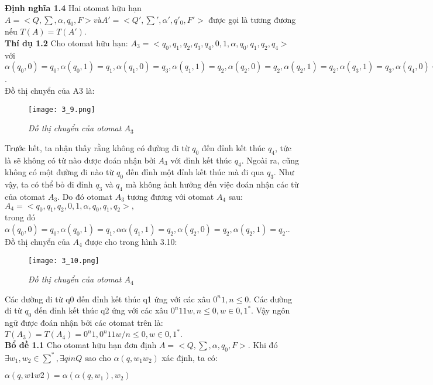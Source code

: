 \begin{flushleft}
\textbf{Định nghĩa 1.4} Hai otomat hữu hạn $A = <Q, \sum, \alpha, q_0, F> và A'= <Q', \sum', \alpha', q'_0, F'>$ được gọi là tương đương nếu $T(A) = T(A')$.\\
\textbf{Thí dụ 1.2} Cho otomat hữu hạn: $A_3 = <{q_0, q_1, q_2, q_3, q_4},{0, 1}, \alpha, q_0, {q_1, q_2, q_4}>$ với $\alpha(q_0,0) = q_0, \alpha(q_0,1) = q_1, \alpha(q_1,0) = q_3, \alpha(q_1,1) = q_2, \alpha(q_2,0) = q_2, \alpha(q_2,1) = q_2, \alpha(q_3,1) = q_3, \alpha(q_4,0) = q_2, \alpha(q_4,1) = q_3.$.\\
\hspace{10mm}Đồ thị chuyển của A3 là:\\
\begin{figure}[ht]
\texttt{[image: 3\_9.png]}
\caption{ \textit{Đồ thị chuyển của otomat $A_3$}}
\end{figure}

Trước hết, ta nhận thấy rằng không có đường đi từ $q_0$ đến đỉnh kết thúc $q_4$, tức là sẽ không có từ nào được đoán nhận bởi $A_3$ với đỉnh kết thúc $q_4$. Ngoài ra, cũng không có một đường đi nào từ $q_0$ đến đỉnh một đỉnh kết thúc mà đi qua $q_3$. Như vậy, ta có thể bỏ đi đỉnh $q_3$ và $q_4$ mà không ảnh hưởng đến việc đoán nhận các từ của otomat $A_3$. Do đó otomat $A_3$ tương đương với otomat $A_4$ sau: \\
$A_4 = <{q_0, q_1, q_2}, {0, 1}, \alpha, q_0, {q_1, q_2}>,$\\
trong đó $\alpha(q_0,0) = q_0, \alpha(q_0,1) = q_1, \alpha\alpha(q_1,1) = q_2, \alpha(q_2,0) = q_2, \alpha(q_2,1) = q_2.$.\\
Đồ thị chuyển của $A_4$ được cho trong hình 3.10:\\
\begin{figure}[ht]
\texttt{[image: 3\_10.png]}
\caption{ \textit{Đồ thị chuyển của otomat $A_4$}}
\end{figure}
Các đường đi từ q0 đến đỉnh kết thúc q1 ứng với các xâu $0^n1, n \le 0$. Các đường đi từ $q_0$ đến đỉnh kết thúc q2 ứng với các xâu $0^n11w, n \le 0, w \in {0, 1}^*$. Vậy ngôn ngữ được đoán nhận bởi các otomat trên là: \\
$T(A_3) = T(A_4) = {0^n1, 0^n11w / n \le 0, w \in {0, 1}^*}.$ \\
\textbf{Bổ đề 1.1} Cho otomat hữu hạn đơn định $A = <Q, \sum, \alpha, q_0, F>.$  Khi đó $\exists w_1, w_2 \in \sum^*, \exists q in Q$ sao cho $\alpha(q, w_1w_2)$ xác định, ta có:\\
\end{flushleft}
$\alpha(q, w1w2) = \alpha(\alpha(q, w_1), w_2)$\\
